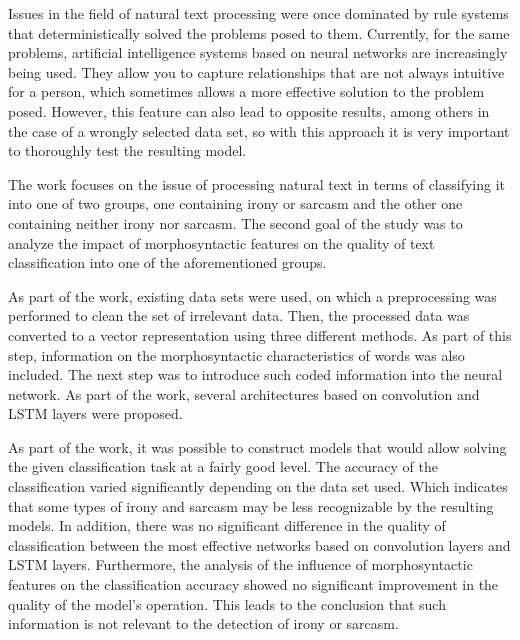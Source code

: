 


Issues in the field of natural text processing were once dominated by rule systems that deterministically solved the problems posed to them. Currently, for the same problems, artificial intelligence systems based on neural networks are increasingly being used. They allow you to capture relationships that are not always intuitive for a person, which sometimes allows a more effective solution to the problem posed. However, this feature can also lead to opposite results, among others in the case of a wrongly selected data set, so with this approach it is very important to thoroughly test the resulting model.

The work focuses on the issue of processing natural text in terms of classifying it into one of two groups, one containing irony or sarcasm and the other one containing neither irony nor sarcasm. The second goal of the study was to analyze the impact of morphosyntactic features on the quality of text classification into one of the aforementioned groups.

As part of the work, existing data sets were used, on which a preprocessing was performed to clean the set of irrelevant data. Then, the processed data was converted to a vector representation using three different methods. As part of this step, information on the morphosyntactic characteristics of words was also included. The next step was to introduce such coded information into the neural network. As part of the work, several architectures based on convolution and LSTM layers were proposed.

As part of the work, it was possible to construct models that would allow solving the given classification task at a fairly good level. The accuracy of the classification varied significantly depending on the data set used. Which indicates that some types of irony and sarcasm may be less recognizable by the resulting models. In addition, there was no significant difference in the quality of classification between the most effective networks based on convolution layers and LSTM layers. Furthermore, the analysis of the influence of morphosyntactic features on the classification accuracy showed no significant improvement in the quality of the model's operation. This leads to the conclusion that such information is not relevant to the detection of irony or sarcasm.




